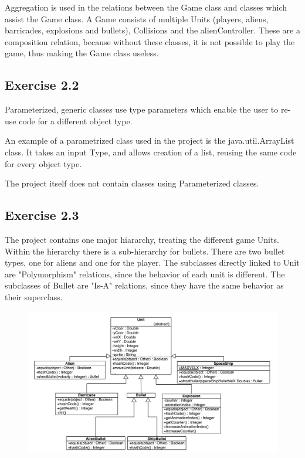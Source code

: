 \documentclass[10pt]{article}
\begin{document}
Aggregation is used in the relations between the Game class and classes which assist the Game class.
A Game consists of multiple Units (players, aliens, barricades, explosions and bullets), Collisions and the alienController. These are a composition relation, because without these classes, it is not possible to play the game, thus making the Game class useless.

\subsection{Exercise  2.2}
Parameterized, generic classes use type parameters which enable the user to re-use code for a different object type. 

An example of a parametrized class used in the project is the java.util.ArrayList class.
It takes an input Type, and allows creation of a list, reusing the same code for every object type.

The project itself does not contain classes using Parameterized classes.
\pagebreak
\subsection{Exercise  2.3}
The project contains one major hiararchy, treating the different game Units. 
Within the hierarchy there is a sub-hierarchy for bullets. There are two bullet types, one for aliens and one for the player.
The subclasses directly linked to Unit are "Polymorphism" relations, since the behavior of each unit is different.
The subclasses of Bullet are "Is-A" relations, since they have the same behavior as their superclass.

\begin{figure}[ht!]
\includegraphics[width=1.1\textwidth]{SI-UMLhierarchies.pdf}
\end{figure}
\end{document}
